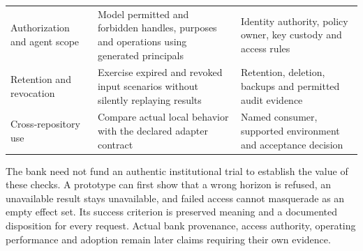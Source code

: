 \begin{longtable}[]{@{}lll@{}}
\begin{minipage}[t]{0.30\columnwidth}
Authorization and agent scope\strut
\end{minipage} & \begin{minipage}[t]{0.30\columnwidth}\raggedright
Model permitted and forbidden handles, purposes and operations using
generated principals\strut
\end{minipage} & \begin{minipage}[t]{0.30\columnwidth}\raggedright
Identity authority, policy owner, key custody and access rules\strut
\end{minipage}\tabularnewline
\begin{minipage}[t]{0.30\columnwidth}\raggedright
Retention and revocation\strut
\end{minipage} & \begin{minipage}[t]{0.30\columnwidth}\raggedright
Exercise expired and revoked input scenarios without silently replaying
results\strut
\end{minipage} & \begin{minipage}[t]{0.30\columnwidth}\raggedright
Retention, deletion, backups and permitted audit evidence\strut
\end{minipage}\tabularnewline
\begin{minipage}[t]{0.30\columnwidth}\raggedright
Cross-repository use\strut
\end{minipage} & \begin{minipage}[t]{0.30\columnwidth}\raggedright
Compare actual local behavior with the declared adapter contract\strut
\end{minipage} & \begin{minipage}[t]{0.30\columnwidth}\raggedright
Named consumer, supported environment and acceptance decision\strut
\end{minipage}\tabularnewline
\bottomrule
\end{longtable}

The bank need not fund an authentic institutional trial to establish the
value of these checks. A prototype can first show that a wrong horizon
is refused, an unavailable result stays unavailable, and failed access
cannot masquerade as an empty effect set. Its success criterion is
preserved meaning and a documented disposition for every request. Actual
bank provenance, access authority, operating performance and adoption
remain later claims requiring their own
evidence.\citep{exec14_custody_design}

\label{exec14:artifact-custody-end}

